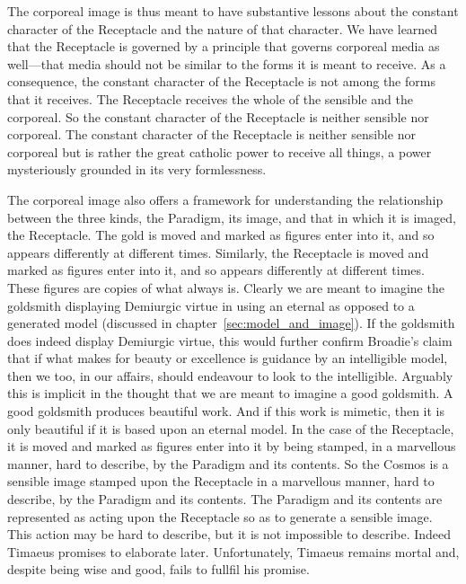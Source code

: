 The corporeal image is thus meant to have substantive lessons about the constant character of the Receptacle and the nature of that character. We have learned that the Receptacle is governed by a principle that governs corporeal media as well---that media should not be similar to the forms it is meant to receive. As a consequence, the constant character of the Receptacle is not among the forms that it receives. The Receptacle receives the whole of the sensible and the corporeal. So the constant character of the Receptacle is neither sensible nor corporeal. The constant character of the Receptacle is neither sensible nor corporeal but is rather the great catholic power to receive all things, a power mysteriously grounded in its very formlessness.

The corporeal image also offers a framework for understanding the relationship between the three kinds, the Paradigm, its image, and that in which it is imaged, the Receptacle. The gold is moved and marked as figures enter into it, and so appears differently at different times. Similarly, the Receptacle is moved and marked as figures enter into it, and so appears differently at different times. These figures are copies of what always is. Clearly we are meant to imagine the goldsmith displaying Demiurgic virtue in using an eternal as opposed to a generated model (discussed in chapter~\ref{sec:model_and_image}). If the goldsmith does indeed display Demiurgic virtue, this would further confirm Broadie's \citeyearpar[28--9]{Broadie:2012vl} claim that if what makes for beauty or excellence is guidance by an intelligible model, then we too, in our affairs, should endeavour to look to the intelligible. Arguably this is implicit in the thought that we are meant to imagine a good goldsmith. A good goldsmith produces beautiful work. And if this work is mimetic, then it is only beautiful if it is based upon an eternal model. In the case of the Receptacle, it is moved and marked as figures enter into it by being stamped, in a marvellous manner, hard to describe, by the Paradigm and its contents. So the Cosmos is a sensible image stamped upon the Receptacle in a marvellous manner, hard to describe, by the Paradigm and its contents. The Paradigm and its contents are represented as acting upon the Receptacle so as to generate a sensible image. This action may be hard to describe, but it is not impossible to describe. Indeed Timaeus promises to elaborate later. Unfortunately, Timaeus remains mortal and, despite being wise and good, fails to fullfil his promise.

